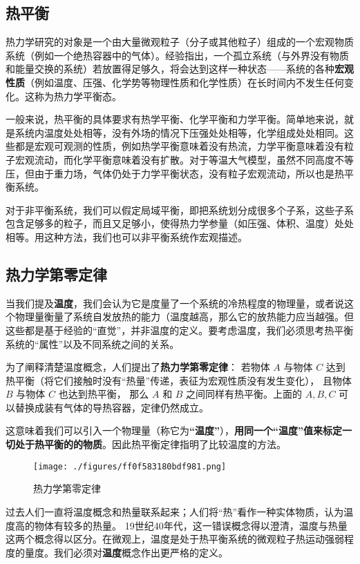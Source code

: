 
\begin{issues}
\issueDraft
\end{issues}

\subsection{热平衡}
热力学研究的对象是一个由大量微观粒子（分子或其他粒子）组成的一个宏观物质系统（例如一个绝热容器中的气体）。经验指出，一个孤立系统（与外界没有物质和能量交换的系统）若放置得足够久，将会达到这样一种状态——系统的各种\textbf{宏观性质}（例如温度、压强、化学势等物理性质和化学性质）在长时间内不发生任何变化。这称为热力学平衡态。

一般来说，热平衡的具体要求有热学平衡、化学平衡和力学平衡。简单地来说，就是系统内温度处处相等，没有外场的情况下压强处处相等，化学组成处处相同。这些都是宏观可观测的性质，例如热学平衡意味着没有热流，力学平衡意味着没有粒子宏观流动，而化学平衡意味着没有扩散。对于等温大气模型，虽然不同高度不等压，但由于重力场，气体仍处于力学平衡状态，没有粒子宏观流动，所以也是热平衡系统。

对于非平衡系统，我们可以假定局域平衡，即把系统划分成很多个子系，这些子系包含足够多的粒子，而且又足够小，使得热力学参量（如压强、体积、温度）处处相等。用这种方法，我们也可以非平衡系统作宏观描述。

\subsection{热力学第零定律}
当我们提及\textbf{温度}，我们会认为它是度量了一个系统的冷热程度的物理量，或者说这个物理量衡量了系统自发放热的能力（温度越高，那么它的放热能力应当越强。但这些都是基于经验的“直觉”，并非温度的定义。要考虑温度，我们必须思考热平衡系统的“属性”以及不同系统之间的关系。

为了阐释清楚温度概念，人们提出了\textbf{热力学第零定律}：
若物体 $A$ 与物体 $C$ 达到热平衡（将它们接触时没有“热量”传递，表征为宏观性质没有发生变化）， 且物体 $B$ 与物体 $C$ 也达到热平衡， 那么 $A$ 和 $B$ 之间同样有热平衡。上面的 $A,B,C$ 可以替换成装有气体的导热容器，定律仍然成立。

这意味着我们可以引入一个物理量（称它为\textbf{“温度”}），\textbf{用同一个“温度”值来标定一切处于热平衡的的物质}。因此热平衡定律指明了比较温度的方法。
\begin{figure}[ht]
\centering
\texttt{[image: ./figures/ff0f583180bdf981.png]}
\caption{热力学第零定律} \label{fig_TherEq_1}
\end{figure}

过去人们一直将温度概念和热量联系起来；人们将“热”看作一种实体物质，认为温度高的物体有较多的热量。 19世纪40年代，这一错误概念得以澄清，温度与热量这两个概念得以区分。在微观上，温度是处于热平衡系统的微观粒子热运动强弱程度的量度。我们必须对\textbf{温度}概念作出更严格的定义。

